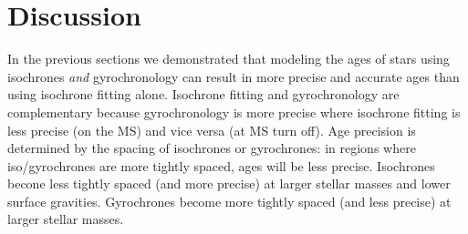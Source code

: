 \section{Discussion}
\label{section:discussion}

In the previous sections we demonstrated that modeling the ages of stars using
isochrones {\it and} gyrochronology can result in more precise and accurate
ages than using isochrone fitting alone.
Isochrone fitting and gyrochronology are  complementary because gyrochronology
is more precise where isochrone fitting is less precise (on the MS) and vice
versa (at MS turn off).
Age precision is determined by the spacing of isochrones or gyrochrones: in
regions where iso/gyrochrones are more tightly spaced, ages will be less
precise.
Isochrones becone less tightly spaced (and more precise) at larger stellar
masses and lower surface gravities.
Gyrochrones become more tightly spaced (and less precise) at larger stellar
masses.

